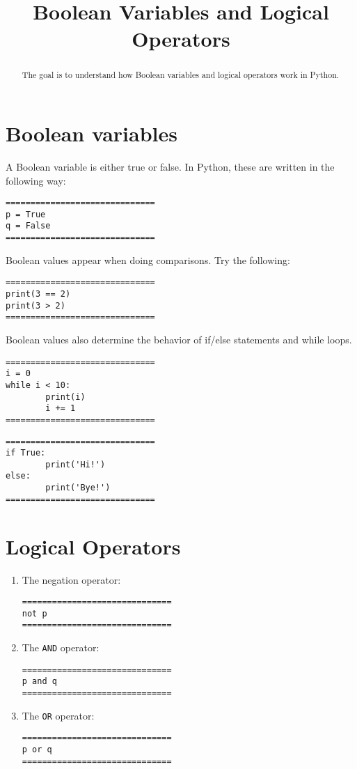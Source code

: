 \documentclass{ximera}
\title{Boolean Variables and Logical Operators}
\begin{document}
\begin{abstract}
The goal is to understand how Boolean variables and logical operators work in Python.
\end{abstract}
\maketitle

\section{Boolean variables}

A Boolean variable is either true or false. In Python, these are written in the following way:

\begin{verbatim}
==============================
p = True
q = False
==============================
\end{verbatim}

Boolean values appear when doing comparisons. Try the following:
\begin{verbatim}
==============================
print(3 == 2)
print(3 > 2)
==============================
\end{verbatim}

Boolean values also determine the behavior of if/else statements and while loops.
\begin{verbatim}
==============================
i = 0
while i < 10:
        print(i)
        i += 1
==============================
\end{verbatim}

\begin{verbatim}
==============================
if True:
        print('Hi!')
else:
        print('Bye!')
==============================
\end{verbatim}
    
\section{Logical Operators}

\begin{enumerate}
    \item The negation operator:
\begin{verbatim}
==============================
not p
==============================
\end{verbatim}

    \item The \verb|AND| operator:
\begin{verbatim}
==============================
p and q
==============================
\end{verbatim}

    \item The \verb|OR| operator:
\begin{verbatim}
==============================
p or q
==============================
\end{verbatim}
\end{enumerate}
\end{document}
